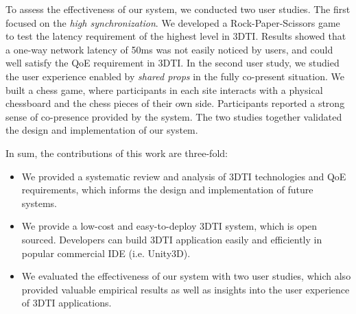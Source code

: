 


To assess the effectiveness of our system, we conducted two user studies. The first focused on the \textit{high synchronization}. We developed a Rock-Paper-Scissors game to test the latency requirement of the highest level in 3DTI. Results showed that a one-way network latency of 50ms was not easily noticed by users, and could well satisfy the QoE requirement in 3DTI. 
In the second user study, we studied the user experience enabled by \textit{shared props} in the fully co-present situation. We built a chess game, where participants in each site interacts with a physical chessboard and the chess pieces of their own side. Participants reported a strong sense of co-presence provided by the system. The two studies together validated the design and implementation of our system. 

\vspace{2mm}

In sum, the contributions of this work are three-fold: 
\begin{itemize}
\item We provided a systematic review and analysis of 3DTI technologies and QoE requirements, which informs the design and implementation of future systems. 
\item We provide a low-cost and easy-to-deploy 3DTI system, which is open sourced. Developers can build 3DTI application easily and efficiently in popular commercial IDE (i.e. Unity3D). 
\item We evaluated the effectiveness of our system with two user studies, which also provided valuable empirical results as well as insights into the user experience of 3DTI applications. 
\end{itemize}



